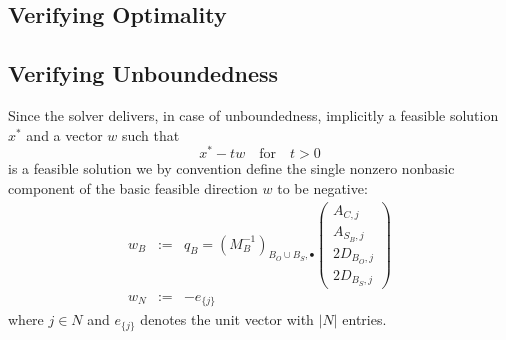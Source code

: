 \documentclass[a4paper]{article}
\begin{document}
\subsection{Verifying Optimality}
\subsection{Verifying Unboundedness}
Since the solver delivers, in case of unboundedness, implicitly a feasible
solution $x^{*}$ and a vector
$w$ such that
\begin{equation}
\label{eq:Unboundedness}
x^{*}-tw \quad \text{for} \quad t>0
\end{equation}
is a feasible solution
we by convention define the single nonzero nonbasic component of the basic
feasible direction $w$ to be negative:
\begin{eqnarray}
\label{def:w_B}
w_{B}&:=&q_{B}=\left(M_{B}^{-1}\right)_{B_{O} \cup B_{S}, \bullet}
\left(
\begin{array}{c}
A_{C,j} \\
\hline
A_{S_{B}, j} \\
\hline
2D_{B_{O}, j} \\
\hline
2D_{B_{S}, j}  
\end{array}
\right) \\
\label{def:w_N}
w_{N}&:=&-e_{\{j\}}
\end{eqnarray}
where $j \in N$ and $e_{\{j\}}$ denotes the unit vector with $\left|N\right|$
entries.
\end{document}
